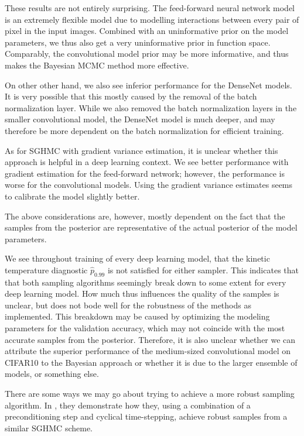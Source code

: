 These results are not entirely surprising.
The feed-forward neural network model is an extremely flexible model due to modelling interactions between every pair of pixel in the input images. 
Combined with an uninformative prior on the model parameters, we thus also get a very uninformative prior in function space.
Comparably, the convolutional model prior may be more informative, and thus makes the Bayesian MCMC method more effective. 

On other other hand, we also see inferior performance for the DenseNet models. 
It is very possible that this mostly caused by the removal of the batch normalization layer. 
While we also removed the batch normalization layers in the smaller convolutional model, the DenseNet model is much deeper, and may therefore be more dependent on the batch normalization for efficient training.

As for SGHMC with gradient variance estimation, it is unclear whether this approach is helpful in a deep learning context. 
We see better performance with gradient estimation for the feed-forward network; however, the performance is worse for the convolutional models.
Using the gradient variance estimates seems to calibrate the model slightly better.

The above considerations are, however, mostly dependent on the fact that the samples from the posterior are representative of the actual posterior of the model parameters. 

We see throughout training of every deep learning model, that the kinetic temperature diagnostic $\hat{p}_{0.99}$ is not satisfied for either sampler. 
This indicates that that both sampling algorithms seemingly break down to some extent for every deep learning model. 
How much thus influences the quality of the samples is unclear, but does not bode well for the robustness of the methods as implemented.
This breakdown may be caused by optimizing the modeling parameters for the validation accuracy, which may not coincide with the most accurate samples from the posterior. 
Therefore, it is also unclear whether we can attribute the superior performance of the medium-sized convolutional model on CIFAR10 to the Bayesian approach or whether it is due to the larger ensemble of models, or something else.

There are some ways we may go about trying to achieve a more robust sampling algorithm. 
In \cite{wenzel_how_2020}, they demonstrate how they, using a combination of a preconditioning step and cyclical time-stepping, achieve robust samples from a similar SGHMC scheme.  

